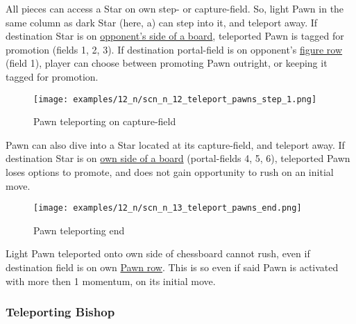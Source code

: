 All pieces can access a Star on own step- or capture-field. So, light Pawn in
the same column as dark Star (here, a) can step into it, and teleport away. If
destination Star is on
\hyperref[sec:Definitions/Chessboard sides, navigation]{opponent's side of a board},
teleported Pawn is tagged for
promotion (fields 1, 2, 3). If destination portal-field is on opponent's
\hyperref[sec:Terms/Figure row]{figure row} (field 1), player can choose between
promoting Pawn outright, or keeping it tagged for promotion.

\clearpage %

\vspace*{-2.0\baselineskip}
\noindent
\begin{figure}[!h]
\texttt{[image: examples/12\_n/scn\_n\_12\_teleport\_pawns\_step\_1.png]}
\caption{Pawn teleporting on capture-field}
\label{fig:scn_n_12_teleport_pawns_step_1}
\end{figure}

Pawn can also dive into a Star located at its capture-field, and teleport away.
If destination Star is on
\hyperref[sec:Definitions/Chessboard sides, navigation]{own side of a board} (portal-fields
4, 5, 6), teleported Pawn loses options to promote, and does not gain opportunity
to rush on an initial move.

\clearpage %

\vspace*{-2.0\baselineskip}
\noindent
\begin{figure}[!h]
\texttt{[image: examples/12\_n/scn\_n\_13\_teleport\_pawns\_end.png]}
\caption{Pawn teleporting end}
\label{fig:scn_n_13_teleport_pawns_end}
\end{figure}

Light Pawn teleported onto own side of chessboard cannot rush, even if
destination field is on own \hyperref[sec:Terms/Pawn row]{Pawn row}. This
is so even if said Pawn is activated with more then 1 momentum, on its
initial move.

\clearpage %

\subsubsection*{Teleporting Bishop}
\label{sec:Nineteen/Star/Teleporting pieces/Teleporting Bishop}

